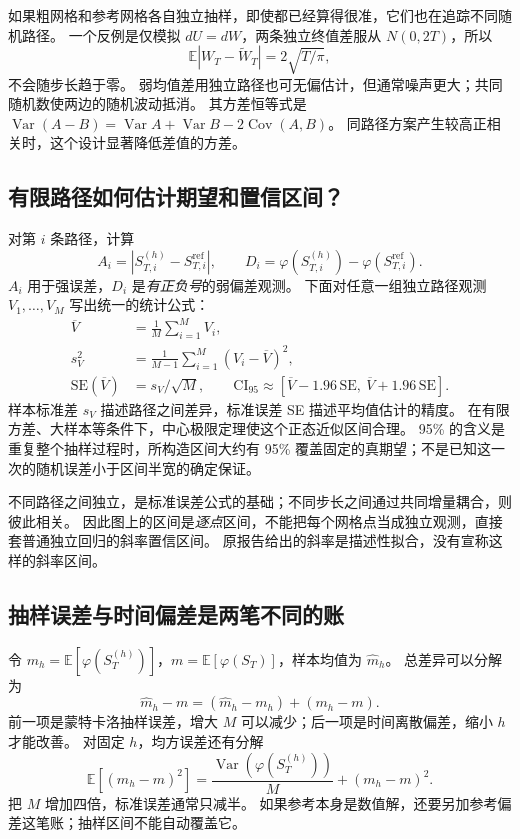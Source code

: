 \documentclass[11pt,a4paper,fontset=none]{ctexart}
\numberwithin{equation}{section}
\newcommand{\E}{\mathbb E}
\DeclareMathOperator{\Var}{Var}
\DeclareMathOperator{\Cov}{Cov}
\begin{document}
如果粗网格和参考网格各自独立抽样，即使都已经算得很准，它们也在追踪不同随机路径。
一个反例是仅模拟 $dU=dW$，两条独立终值差服从 $N(0,2T)$，所以
\begin{equation}\label{eq:errors-independent-counterexample}
 \E|W_T-\widetilde W_T|=2\sqrt{T/\pi},
\end{equation}
不会随步长趋于零。
弱均值差用独立路径也可无偏估计，但通常噪声更大；共同随机数使两边的随机波动抵消。
其方差恒等式是 $\Var(A-B)=\Var A+\Var B-2\Cov(A,B)$。
同路径方案产生较高正相关时，这个设计显著降低差值的方差。

\subsection{有限路径如何估计期望和置信区间？}
对第 $i$ 条路径，计算
\begin{equation}\label{eq:errors-observations}
 A_i=|S_{T,i}^{(h)}-S_{T,i}^{\mathrm{ref}}|,\qquad
 D_i=\varphi(S_{T,i}^{(h)})-\varphi(S_{T,i}^{\mathrm{ref}}).
\end{equation}
$A_i$ 用于强误差，$D_i$ 是\emph{有正负号}的弱偏差观测。
下面对任意一组独立路径观测 $V_1,\ldots,V_M$ 写出统一的统计公式：
\begin{align}
 \overline V&=\frac1M\sum_{i=1}^M V_i,\label{eq:errors-sample-mean}\\
 s_V^2&=\frac1{M-1}\sum_{i=1}^M(V_i-\overline V)^2,\label{eq:errors-sample-var}\\
 \mathrm{SE}(\overline V)&=s_V/\sqrt M,\qquad
 \mathrm{CI}_{95}\approx[\overline V-1.96\,\mathrm{SE},\ \overline V+1.96\,\mathrm{SE}].\label{eq:errors-ci}
\end{align}
样本标准差 $s_V$ 描述路径之间差异，标准误差 SE 描述平均值估计的精度。
在有限方差、大样本等条件下，中心极限定理使这个正态近似区间合理。
95\% 的含义是重复整个抽样过程时，所构造区间大约有 95\% 覆盖固定的真期望；不是已知这一次的随机误差小于区间半宽的确定保证。

不同路径之间独立，是标准误差公式的基础；不同步长之间通过共同增量耦合，则彼此相关。
因此图上的区间是\emph{逐点}区间，不能把每个网格点当成独立观测，直接套普通独立回归的斜率置信区间。
原报告给出的斜率是描述性拟合，没有宣称这样的斜率区间。

\subsection{抽样误差与时间偏差是两笔不同的账}
令 $m_h=\E[\varphi(S_T^{(h)})]$，$m=\E[\varphi(S_T)]$，样本均值为 $\widehat m_h$。
总差异可以分解为
\begin{equation}\label{eq:errors-decomposition}
 \widehat m_h-m=(\widehat m_h-m_h)+(m_h-m).
\end{equation}
前一项是蒙特卡洛抽样误差，增大 $M$ 可以减少；后一项是时间离散偏差，缩小 $h$ 才能改善。
对固定 $h$，均方误差还有分解
\begin{equation}\label{eq:errors-mse}
 \E[(\widehat m_h-m)^2]=\frac{\Var(\varphi(S_T^{(h)}))}{M}+(m_h-m)^2.
\end{equation}
把 $M$ 增加四倍，标准误差通常只减半。
如果参考本身是数值解，还要另加参考偏差这笔账；抽样区间不能自动覆盖它。
\end{document}
